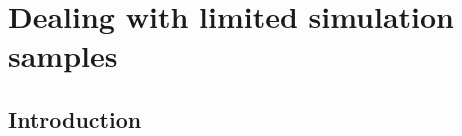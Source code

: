 \chapter{Dealing with limited simulation samples}

\newcommand{\vectheta}{\vec{\theta}}
\newcommand{\vecw}{\vec{w}}
\newcommand{\prob}{\mathcal{P}}
\newcommand{\gprob}{\mathcal{G}}
\newcommand{\meanl}{\mathcal{L}_{\textmd{Mean}}}
\newcommand{\mcl}{\like_\textmd{Eff}}
\newcommand{\gl}{\like_\textmd{G}}
\newcommand{\adhoc}{\mathcal{L}_{\textmd{AdHoc}}}
\newcommand{\lpoisson}{l_{\textmd{Poisson}}}
\newcommand{\lmc}{l_\textmd{Eff}}
\newcommand{\lbarlow}{\like_{\textmd{BB}}}
\newcommand{\hatmu}{\hat{\mu}}
\newcommand{\hatpoisson}{\hatmu_\textmd{Poisson}}
\newcommand{\hatmc}{\hatmu_\textmd{Eff}}
\newcommand{\au}{arb. unit}
\newcommand{\agpar}{\alpha}
\newcommand{\bgpar}{\beta}
\newcommand{\emcee}{\texttt{emcee}}
\newcommand{\meff}{m_\mathrm{Eff}}
\newcommand{\weff}{w_\mathrm{Eff}}

\section{Introduction\label{sec:intro}}

